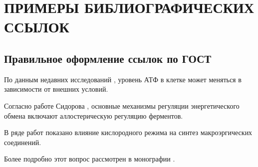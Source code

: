 \section{ПРИМЕРЫ БИБЛИОГРАФИЧЕСКИХ ССЫЛОК}

\subsection{Правильное оформление ссылок по ГОСТ}

По данным недавних исследований \cite{example1}, уровень АТФ в клетке может меняться в зависимости от внешних условий.

Согласно работе Сидорова \cite[с.~42]{example2}, основные механизмы регуляции энергетического обмена включают аллостерическую регуляцию ферментов.

В ряде работ \cite{example1,example3} показано влияние кислородного режима на синтез макроэргических соединений.

Более подробно этот вопрос рассмотрен в монографии \cite[с.~42--47]{example2}.